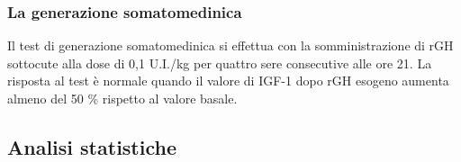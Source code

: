 \subsubsection*{La generazione somatomedinica}
Il test di generazione somatomedinica si effettua con la somministrazione di rGH sottocute alla dose di 0,1 U.I./kg per quattro sere consecutive alle ore 21. La risposta al test è normale quando il valore di IGF-1 dopo rGH esogeno aumenta almeno del 50 \%
rispetto al valore basale.



\subsection{Analisi statistiche}
